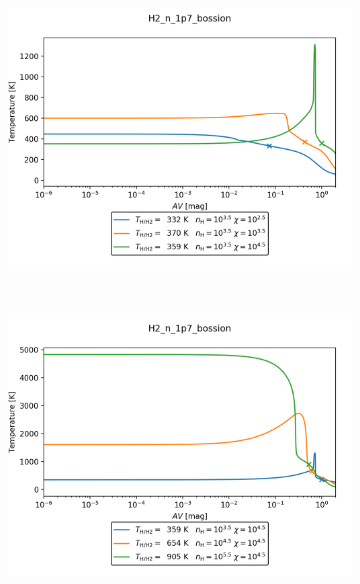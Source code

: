 \begin{figure}[h!]
    \centering
    \begin{subfigure}[t]{0.45\textwidth} %
        \centering \includegraphics[trim = {0 0 0 0},clip,width=1\textwidth]{figure/H2/mapGloverBossion/H2_n_1p7_bossion_d3p5r2p5_d3p5r3p5_d3p5r4p5.png} 
        \caption{}
    \end{subfigure}
    ~ 
    \begin{subfigure}[t]{0.45\textwidth}
        \centering \includegraphics[trim = {0 0 0 0},clip,width=1\textwidth]{figure/H2/mapGloverBossion/H2_n_1p7_bossion_d3p5r4p5_d4p5r4p5_d5p5r4p5.png}
        \caption{}
    \end{subfigure}


\end{figure}

